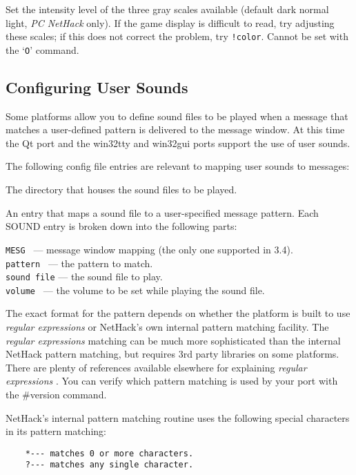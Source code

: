 \item[\ib{videoshades}]
Set the intensity level of the three gray scales available
(default dark normal light, {\it PC\/ NetHack\/} only).
If the game display is difficult to read, try adjusting these scales;
if this does not correct the problem, try {\tt !color}.
Cannot be set with the `{\tt O}' command.
\elist

\subsection*{Configuring User Sounds}

Some platforms allow you to define sound files to be played when a message 
that matches a user-defined pattern is delivered to the message window.
At this time the Qt port and the win32tty and win32gui ports support the
use of user sounds.

The following config file entries are relevant to mapping user sounds
to messages:

\blist{}
\item[\ib{SOUNDDIR}]
The directory that houses the sound files to be played.
\item[\ib{SOUND}]
An entry that maps a sound file to a user-specified message pattern.
Each SOUND entry is broken down into the following parts:

{\tt MESG      } --- message window mapping (the only one supported in 3.4).\\
{\tt pattern   } --- the pattern to match.\\
{\tt sound file} --- the sound file to play.\\
{\tt volume    } --- the volume to be set while playing the sound file.
\elist

The exact format for the pattern depends on whether the platform is
built to use {\it regular expressions \/} or NetHack's own internal pattern 
matching facility. The {\it regular expressions \/} matching can be much more 
sophisticated than the internal NetHack pattern matching, but requires 
3rd party libraries on some platforms.  There are plenty of references 
available elsewhere for explaining {\it regular expressions \/}. You can verify 
which pattern matching is used by your port with the 
\#version command.  

NetHack's internal pattern matching routine uses the following
special characters in its pattern matching:

\begin{verbatim}
    *--- matches 0 or more characters.
    ?--- matches any single character.
\end{verbatim}

